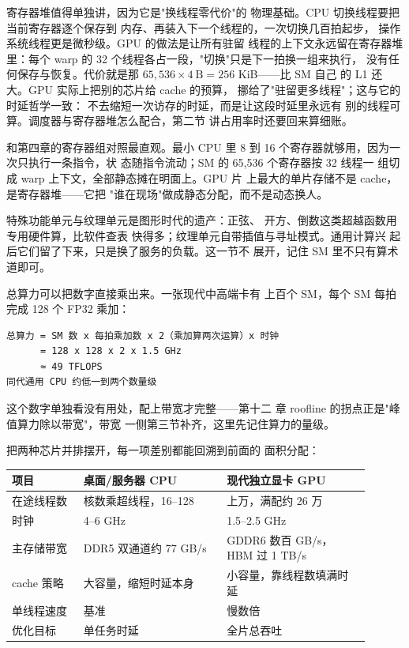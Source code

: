 寄存器堆值得单独讲，因为它是"换线程零代价"的
物理基础。CPU 切换线程要把当前寄存器逐个保存到
内存、再装入下一个线程的，一次切换几百拍起步，
操作系统线程更是微秒级。GPU 的做法是让所有驻留
线程的上下文永远留在寄存器堆里：每个 warp 的 32
个线程各占一段，"切换"只是下一拍换一组来执行，
没有任何保存与恢复。代价就是那
$65,536\times4\ \text{B}=256$ KiB——比 SM 自己
的 L1 还大。GPU 实际上把别的芯片给 cache 的预算，
挪给了"驻留更多线程"；这与它的时延哲学一致：
不去缩短一次访存的时延，而是让这段时延里永远有
别的线程可算。调度器与寄存器堆怎么配合，第二节
讲占用率时还要回来算细账。

和第四章的寄存器组对照最直观。最小 CPU 里 8 到
16 个寄存器就够用，因为一次只执行一条指令，状
态随指令流动；SM 的 65,536 个寄存器按 32 线程一
组切成 warp 上下文，全部静态摊在明面上。GPU 片
上最大的单片存储不是 cache，是寄存器堆——它把
"谁在现场"做成静态分配，而不是动态换人。

特殊功能单元与纹理单元是图形时代的遗产：正弦、
开方、倒数这类超越函数用专用硬件算，比软件查表
快得多；纹理单元自带插值与寻址模式。通用计算兴
起后它们留了下来，只是换了服务的负载。这一节不
展开，记住 SM 里不只有算术道即可。

总算力可以把数字直接乘出来。一张现代中高端卡有
上百个 SM，每个 SM 每拍完成 128 个 FP32 乘加：

\begin{lstlisting}
总算力 = SM 数 x 每拍乘加数 x 2（乘加算两次运算）x 时钟
      = 128 x 128 x 2 x 1.5 GHz
      ≈ 49 TFLOPS
同代通用 CPU 约低一到两个数量级
\end{lstlisting}

这个数字单独看没有用处，配上带宽才完整——第十二
章 roofline 的拐点正是"峰值算力除以带宽"，带宽
一侧第三节补齐，这里先记住算力的量级。

把两种芯片并排摆开，每一项差别都能回溯到前面的
面积分配：

\begin{longtable}{L{0.18\linewidth}L{0.36\linewidth}L{0.36\linewidth}}
\toprule
项目 & 桌面/服务器 CPU & 现代独立显卡 GPU \\
\midrule
在途线程数 & 核数乘超线程，16--128 & 上万，满配约 26 万 \\
时钟 & 4--6 GHz & 1.5--2.5 GHz \\
主存储带宽 & DDR5 双通道约 77 GB/s & GDDR6 数百 GB/s，HBM 过 1 TB/s \\
cache 策略 & 大容量，缩短时延本身 & 小容量，靠线程数填满时延 \\
单线程速度 & 基准 & 慢数倍 \\
优化目标 & 单任务时延 & 全片总吞吐 \\
\bottomrule
\end{longtable}

